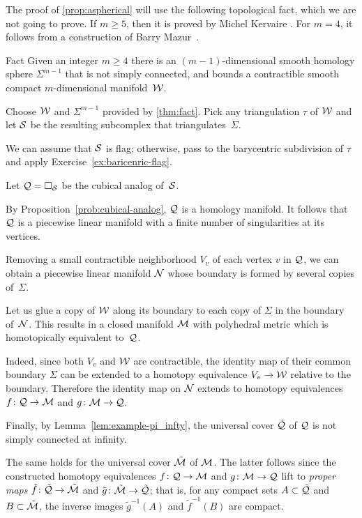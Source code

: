 The proof of \ref{prop:aspherical} will use the following topological fact, which we are not going to prove.
If $m\ge 5$, then it is proved by Michel Kervaire \cite{kervaire}.
For $m=4$, it follows from a construction of Barry Mazur~\cite{mazur}.

\begin{thm}{Fact}\label{thm:fact}
Given an integer $m\ge 4$ there is an $(m-1)$-dimensional smooth homology sphere $\Sigma^{m-1}$ that is not simply connected, and bounds a contractible smooth compact $m$-dimensional manifold~$\mathcal{W}$.
\end{thm}


Choose $\mathcal{W}$ and $\Sigma^{m-1}$ provided by \ref{thm:fact}.
Pick any triangulation $\tau$ of $\mathcal{W}$ and let $\mathcal{S}$ be the resulting subcomplex that triangulates~$\Sigma$.

We can assume that $\mathcal{S}$ is flag; 
otherwise, pass to the barycentric subdivision 
of $\tau$ and apply Exercise~\ref{ex:baricenric-flag}.


Let $\mathcal{Q}=\square_{\mathcal{S}}$ be the cubical analog of~$\mathcal{S}$.

By Proposition~\ref{prob:cubical-analog},
$\mathcal{Q}$ is a homology manifold.
It follows that $\mathcal{Q}$ is a piecewise linear manifold 
with a finite number of singularities at its vertices.


Removing a small contractible neighborhood $V_v$ of each vertex $v$ in $\mathcal{Q}$,
we can obtain a piecewise linear manifold $\mathcal{N}$
whose boundary is formed by several copies of~$\Sigma$.

Let us glue a copy of $\mathcal{W}$ along its boundary to each copy of $\Sigma$ in the boundary of~$\mathcal{N}$.
This results in a closed manifold 
$\mathcal{M}$ with polyhedral metric which is homotopically equivalent to~$\mathcal{Q}$.

Indeed, since both $V_v$ and $\mathcal{W}$ are contractible, the identity map of their common boundary $\Sigma$ can be extended to a homotopy equivalence $V_v\to\mathcal{W}$ relative to the boundary.
Therefore the identity map on $\mathcal{N}$ extends to homotopy equivalences 
$f\colon \mathcal{Q}\to \mathcal{M}$ and $g\colon\mathcal{M}\to \mathcal{Q}$.

Finally, by Lemma~\ref{lem:example-pi_infty},
the universal cover $\tilde{\mathcal{Q}}$ of $\mathcal{Q}$
is not simply connected at infinity.

The same holds for 
the universal cover $\tilde{\mathcal{M}}$ of $\mathcal{M}$.
The latter follows since the constructed homotopy equivalences 
$f\colon \mathcal{Q}\to \mathcal{M}$ and $g\:\spc M\z\to \spc Q$ 
lift to {}\emph{proper maps} 
$\tilde f \colon \tilde{\mathcal{Q}}\to \tilde{\mathcal{M}}$
and $\tilde g \colon \tilde{\mathcal{M}}\to \tilde{\mathcal{Q}}$;
that is, for any compact sets $A\subset \tilde{\mathcal{Q}}$ and $B\subset\tilde{\mathcal{M}}$, the inverse images $\tilde g^{-1}(A)$ and $\tilde f^{-1}(B)$ are compact.
\qeds


